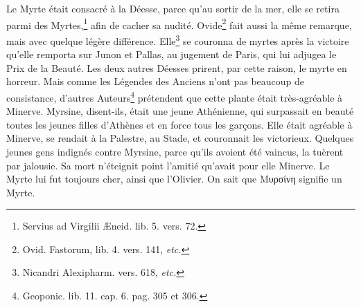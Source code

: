 \documentclass[a4paper, 18pt, oneside]{article}
\begin{document}
Le Myrte était consacré à la Déesse, parce qu'au sortir de la mer, elle se retira parmi des Myrtes,\footnote{Servius ad Virgilii Æneid. lib. 5. vers. 72.} afin de cacher sa nudité. Ovide\footnote{Ovid. Fastorum, lib. 4. vers. 141, \emph{etc.}} fait aussi la même remarque, mais avec quelque légère différence. Elle\footnote{Nicandri Alexipharm. vers. 618, \emph{etc.}} se couronna de myrtes après la victoire qu'elle remporta sur Junon et Pallas, au jugement de Paris, qui lui adjugea le Prix de la Beauté. Les deux autres Déesses prirent, par cette raison, le myrte en horreur. Mais comme les Légendes des Anciens n'ont pas beaucoup de consistance, d'autres Auteurs\footnote{Geoponic. lib. 11. cap. 6. pag. 305 et 306.} prétendent que cette plante était très-agréable à Minerve. Myrsine, disent-ils, était une jeune Athénienne, qui surpassait en beauté toutes les jeunes filles d'Athènes et en force tous les garçons. Elle était agréable à Minerve, se rendait à la Palestre, au Stade, et couronnait les victorieux. Quelques jeunes gens indignés contre Myrsine, parce qu'ils avoient été vaincus, la tuèrent par jalousie. Sa mort n'éteignit point l'amitié qu'avait pour elle Minerve. Le Myrte lui fut toujours cher, ainsi que l'Olivier. On sait que Μυρσίνη signifie un Myrte.
\end{document}

